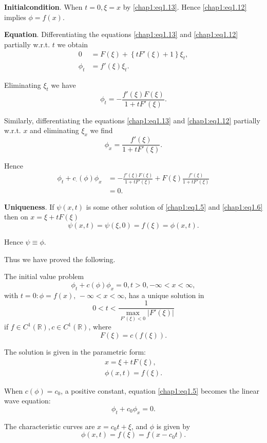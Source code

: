 \medskip\noindent
{\bf\large Initial\pageoriginale condition}. When $t=0, \xi=x$ by \eqref{chap1:eq1.13}. Hence \eqref{chap1:eq1.12} implies $\phi=f(x)$.

\medskip\noindent
{\bf\large Equation}. Differentiating the equations \eqref{chap1:eq1.13} and \eqref{chap1:eq1.12} partially w.r.t. $t$ we obtain
\begin{align*}
0&=F(\xi)+\left\{tF'(\xi)+1\right\}\xi_t,\\
\phi_t&= f'(\xi)\xi_t.
\end{align*}

Eliminating $\xi_t$ we have 
$$
\phi_t=-\frac{f'(\xi)F(\xi)}{1+tF'(\xi)}.
$$

Similarly, differentiating the equations \eqref{chap1:eq1.13} and \eqref{chap1:eq1.12} partially w.r.t. $x$ and eliminating $\xi_x$ we find
$$
\phi_x=\frac{f'(\xi)}{1+tF'(\xi)}.
$$

Hence
\begin{align*}
\phi_t + c_{\cdotp} (\phi)\phi_x & = - \frac{f'(\xi)F(\xi)} {1+tF'(\xi)} +F(\xi) \frac{f'(\xi)}{1+tF'(\xi)}\\
& = 0.
\end{align*}

\medskip\noindent
{\bf \large Uniqueness}. If $\psi(x,t)$ is some other solution of \eqref{chap1:eq1.5} and \eqref{chap1:eq1.6} then on $x=\xi +tF(\xi)$
$$
\psi(x,t)=\psi(\xi,0)=f(\xi)=\phi(x,t).
$$

Hence $\psi \equiv\phi$.

Thus we have proved the following.

\begin{theorem*}
The initial value problem
$$
\phi_t+c(\phi)\phi_x=0, t>0, -\infty <x<\infty,
$$
with $t=0:\phi=f(x),\, -\infty < x < \infty$, has a unique solution in 
\begin{equation*}
0<t<\frac{1}{\underset{F'(\xi)<0}{\max}|F'(\xi)|}
\end{equation*}\pageoriginale
if $f\in C^1(\mathbb{R}), c\in C^1(\mathbb{R})$, where 
$$
F(\xi)=c(f(\xi)).
$$

The solution is given in the parametric form:
\begin{align*}
x=\xi +tF(\xi),\\
\phi(x,t)=f(\xi).
\end{align*}
\end{theorem*}

\begin{remark*}
When $c(\phi)=c_0$, a positive constant, equation \eqref{chap1:eq1.5} becomes the linear wave equation:
$$
\phi_t+c_0\phi_x=0.
$$

The characteristic curves are $x=c_0t+\xi$, and $\phi$ is given by 
$$
\phi(x,t)=f(\xi)=f(x-c_0t).
$$
\end{remark*}

